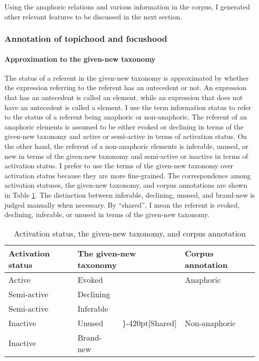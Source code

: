 Using the anaphoric relations and various information in the corpus,
I generated other relevant features to be discussed in the next section.

\subsubsection{Annotation of topichood and focushood}\label{FW:Cor:TopFoc}

\paragraph{Approximation to the given-new taxonomy}

The status of a referent in the given-new taxonomy is approximated by
whether the expression referring to the referent has an antecedent or not.
An expression that has an antecedent is called an  element,
while an expression that does not have an antecedent is called a  element.
I use the term information status to refer to the status of a referent being anaphoric or non-anaphoric.
The referent of an anaphoric elements is assumed to be either evoked or declining in terms of the given-new taxonomy and active or semi-active in terms of activation status.
On the other hand, the referent of a non-anaphoric elements is inferable, unused, or new in terms of the given-new taxonomy and
semi-active or inactive in terms of activation status.
I prefer to use the terms of the given-new taxonomy over activation status because
they are more fine-grained.
The correspondence among activation statuses, the given-new taxonomy, and corpus annotations are shown in Table \ref{ActStatusCorpus}.
The distinction between inferable, declining, unused, and brand-new is judged manually when necessary.
By ``shared'', I mean the referent is evoked, declining, inferable, or unused in terms of the given-new taxonomy.

\begin{table}
	\caption{Activation status, the given-new taxonomy, and corpus annotation}
	\label{ActStatusCorpus}
	\begin{center}
	\begin{tabular}{llll}
	\toprule
	Activation status & \multicolumn{2}{l}{The given-new taxonomy} & Corpus annotation \\
	\midrule
	Active & Evoked & & Anaphoric \\
	Semi-active & Declining &  & \\
	\rowcolor{gray}
	Semi-active & Inferable &  & \\
	\rowcolor{gray}
	Inactive & Unused & \rdelim\}{-4}{20pt}[Shared] & Non-anaphoric \\
	\rowcolor{gray}
	Inactive & Brand-new & &  \\
	\bottomrule
	\end{tabular}\\
	\end{center}
\end{table}


